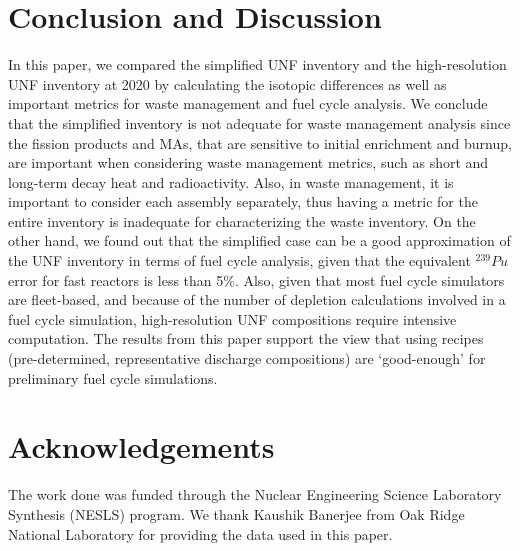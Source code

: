 \documentclass{anstrans}
\begin{document}
\section{Conclusion and Discussion}
In this paper, we compared the simplified \gls{UNF}
inventory and the high-resolution \gls{UNF} inventory
at 2020 by calculating the isotopic differences as well
as important metrics for waste management and fuel cycle analysis.
We conclude that the simplified inventory is not adequate for waste
management analysis since the fission products and \glspl{MA}, that are sensitive to 
initial enrichment and burnup, are important when considering
waste management metrics, such as short and long-term decay heat and radioactivity.
Also, in waste management, it is important to consider each assembly separately,
thus having a metric for the entire inventory is inadequate for characterizing the waste inventory.
On the other hand, we found out that the simplified case can be a good
approximation of the \gls{UNF} inventory in terms of fuel cycle analysis,
given that the equivalent $^{239}Pu$ error for fast reactors is less than
5\%. Also, given that most fuel cycle simulators are fleet-based, and
because of the number of depletion calculations involved in a fuel cycle
simulation, high-resolution \gls{UNF} compositions require intensive computation.
The results from this paper support the view that using recipes (pre-determined, representative
discharge compositions) are `good-enough' for preliminary fuel cycle simulations.


\section{Acknowledgements}
The work done was funded through the Nuclear Engineering Science
Laboratory Synthesis (NESLS) program. We thank Kaushik Banerjee
from Oak Ridge National Laboratory for providing the data used
in this paper. 



\end{document}
